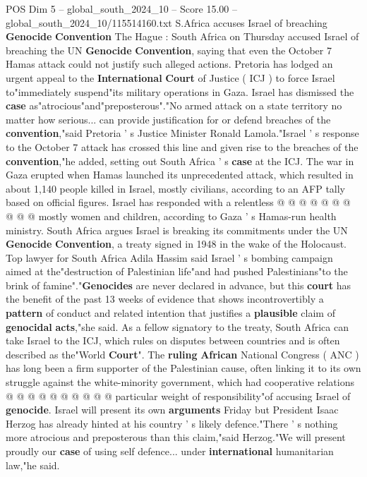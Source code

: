 \begin{textsample}{POS Dim 5 – global\_south\_2024\_10 – Score 15.00 – global\_south\_2024\_10/115514160.txt}  \label{ex:f5_pos_347}
S.Africa accuses Israel of breaching \textbf{Genocide} \textbf{Convention} The Hague : South Africa on Thursday accused Israel of breaching the UN \textbf{Genocide} \textbf{Convention}, saying that even the October 7 Hamas attack could not justify such alleged actions.
Pretoria has lodged an urgent appeal to the \textbf{International} \textbf{Court} of Justice ( ICJ ) to force Israel to"immediately suspend"its military operations in Gaza.
Israel has dismissed the \textbf{case} as"atrocious"and"preposterous"."No armed attack on a state territory no matter how serious... can provide justification for or defend breaches of the \textbf{convention},"said Pretoria ' s Justice Minister Ronald Lamola."Israel ' s response to the October 7 attack has crossed this line and given rise to the breaches of the \textbf{convention},"he added, setting out South Africa ' s \textbf{case} at the ICJ.
The war in Gaza erupted when Hamas launched its unprecedented attack, which resulted in about 1,140 people killed in Israel, mostly civilians, according to an AFP tally based on official figures.
Israel has responded with a relentless @ @ @ @ @ @ @ @ @ @ mostly women and children, according to Gaza ' s Hamas-run health ministry.
South Africa argues Israel is breaking its commitments under the UN \textbf{Genocide} \textbf{Convention}, a treaty signed in 1948 in the wake of the Holocaust.
Top lawyer for South Africa Adila Hassim said Israel ' s bombing campaign aimed at the"destruction of Palestinian life"and had pushed Palestinians"to the brink of famine"."\textbf{Genocides} are never declared in advance, but this \textbf{court} has the benefit of the past 13 weeks of evidence that shows incontrovertibly a \textbf{pattern} of conduct and related intention that justifies a \textbf{plausible} claim of \textbf{genocidal} \textbf{acts},"she said.
As a fellow signatory to the treaty, South Africa can take Israel to the ICJ, which rules on disputes between countries and is often described as the"World \textbf{Court}".
The \textbf{ruling} \textbf{African} National Congress ( ANC ) has long been a firm supporter of the Palestinian cause, often linking it to its own struggle against the white-minority government, which had cooperative relations @ @ @ @ @ @ @ @ @ @ particular weight of responsibility"of accusing Israel of \textbf{genocide}.
Israel will present its own \textbf{arguments} Friday but President Isaac Herzog has already hinted at his country ' s likely defence."There ' s nothing more atrocious and preposterous than this claim,"said Herzog."We will present proudly our \textbf{case} of using self defence... under \textbf{international} humanitarian law,"he said.

\end{textsample}
